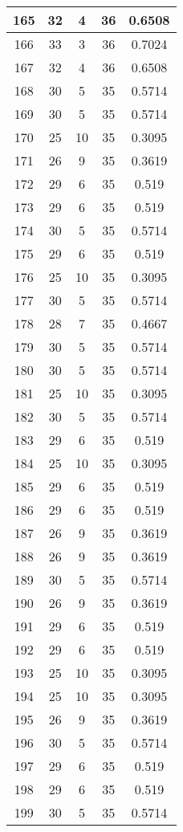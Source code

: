 \documentclass[letterpaper, 12pt]{article}
\begin{document}
\begin{longtable}{|c|c|c|c|c|}
\hline
165 & 32 & 4 & 36 & 0.6508 \\
\hline
166 & 33 & 3 & 36 & 0.7024 \\
\hline
167 & 32 & 4 & 36 & 0.6508 \\
\hline
168 & 30 & 5 & 35 & 0.5714 \\
\hline
169 & 30 & 5 & 35 & 0.5714 \\
\hline
170 & 25 & 10 & 35 & 0.3095 \\
\hline
171 & 26 & 9 & 35 & 0.3619 \\
\hline
172 & 29 & 6 & 35 & 0.519 \\
\hline
173 & 29 & 6 & 35 & 0.519 \\
\hline
174 & 30 & 5 & 35 & 0.5714 \\
\hline
175 & 29 & 6 & 35 & 0.519 \\
\hline
176 & 25 & 10 & 35 & 0.3095 \\
\hline
177 & 30 & 5 & 35 & 0.5714 \\
\hline
178 & 28 & 7 & 35 & 0.4667 \\
\hline
179 & 30 & 5 & 35 & 0.5714 \\
\hline
180 & 30 & 5 & 35 & 0.5714 \\
\hline
181 & 25 & 10 & 35 & 0.3095 \\
\hline
182 & 30 & 5 & 35 & 0.5714 \\
\hline
183 & 29 & 6 & 35 & 0.519 \\
\hline
184 & 25 & 10 & 35 & 0.3095 \\
\hline
185 & 29 & 6 & 35 & 0.519 \\
\hline
186 & 29 & 6 & 35 & 0.519 \\
\hline
187 & 26 & 9 & 35 & 0.3619 \\
\hline
188 & 26 & 9 & 35 & 0.3619 \\
\hline
189 & 30 & 5 & 35 & 0.5714 \\
\hline
190 & 26 & 9 & 35 & 0.3619 \\
\hline
191 & 29 & 6 & 35 & 0.519 \\
\hline
192 & 29 & 6 & 35 & 0.519 \\
\hline
193 & 25 & 10 & 35 & 0.3095 \\
\hline
194 & 25 & 10 & 35 & 0.3095 \\
\hline
195 & 26 & 9 & 35 & 0.3619 \\
\hline
196 & 30 & 5 & 35 & 0.5714 \\
\hline
197 & 29 & 6 & 35 & 0.519 \\
\hline
198 & 29 & 6 & 35 & 0.519 \\
\hline
199 & 30 & 5 & 35 & 0.5714 \\
\hline
\end{longtable}
\end{document}
